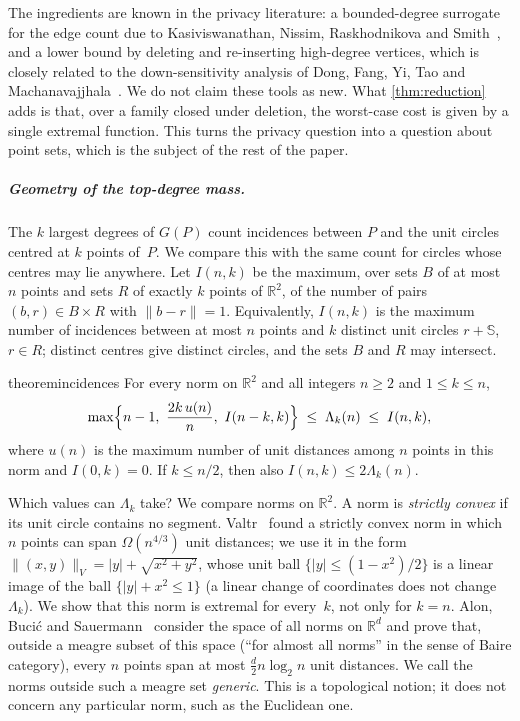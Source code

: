 \documentclass[anonymous,a4paper,USenglish,cleveref,autoref,thm-restate]{socg-lipics-v2021}
\newcommand{\R}{\mathbb{R}}
\newcommand{\Lam}{\Lambda}
\newcommand{\nrm}[1]{\lVert #1\rVert}
\begin{document}
The ingredients are known in the privacy literature: a bounded-degree surrogate for the edge count due to Kasiviswanathan, Nissim, Raskhodnikova and Smith~\cite{KNRS13}, and a lower bound by deleting and re-inserting high-degree vertices, which is closely related to the down-sensitivity analysis of Dong, Fang, Yi, Tao and Machanavajjhala~\cite{R2T22}. We do not claim these tools as new. What \cref{thm:reduction} adds is that, over a family closed under deletion, the worst-case cost is given by a single extremal function. This turns the privacy question into a question about point sets, which is the subject of the rest of the paper.

\subparagraph*{Geometry of the top-degree mass.}
The $k$ largest degrees of $G(P)$ count incidences between $P$ and the unit circles centred at $k$ points of~$P$. We compare this with the same count for circles whose centres may lie anywhere. Let $I(n,k)$ be the maximum, over sets $B$ of at most $n$ points and sets $R$ of exactly $k$ points of $\R^2$, of the number of pairs $(b,r)\in B\times R$ with $\nrm{b-r}=1$. Equivalently, $I(n,k)$ is the maximum number of incidences between at most $n$ points and $k$ distinct unit circles $r+\mathbb S$, $r\in R$; distinct centres give distinct circles, and the sets $B$ and $R$ may intersect.

\begin{restatable}{theorem}{incidences}
\label{thm:incidences}
For every norm on $\R^2$ and all integers $n\ge2$ and $1\le k\le n$,
\[
  \max\Bigl\{n-1,\ \frac{2k\,u(n)}{n},\ I(n-k,k)\Bigr\}\;\le\;\Lam_k(n)\;\le\;I(n,k),
\]
where $u(n)$ is the maximum number of unit distances among $n$ points in this norm and $I(0,k)=0$. If $k\le n/2$, then also $I(n,k)\le 2\Lam_k(n)$.
\end{restatable}

Which values can $\Lam_k$ take? We compare norms on $\R^2$. A norm is \emph{strictly convex} if its unit circle contains no segment. Valtr~\cite{Valtr05} found a strictly convex norm in which $n$ points can span $\Omega(n^{4/3})$ unit distances; we use it in the form $\nrm{(x,y)}_V=|y|+\sqrt{x^2+y^2}$, whose unit ball $\{|y|\le(1-x^2)/2\}$ is a linear image of the ball $\{|y|+x^2\le1\}$ (a linear change of coordinates does not change $\Lam_k$). We show that this norm is extremal for every~$k$, not only for $k=n$. Alon, Buci\'c and Sauermann~\cite{ABS23} consider the space of all norms on $\R^d$ and prove that, outside a meagre subset of this space (``for almost all norms'' in the sense of Baire category), every $n$ points span at most $\frac d2 n\log_2 n$ unit distances. We call the norms outside such a meagre set \emph{generic}. This is a topological notion; it does not concern any particular norm, such as the Euclidean one.
\end{document}
